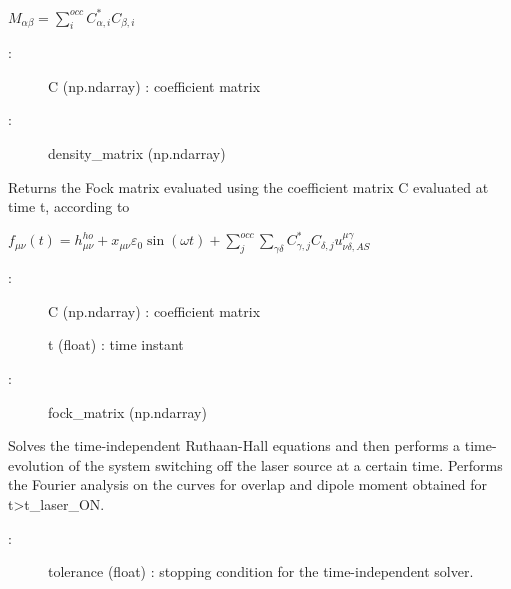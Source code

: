 \documentclass[letterpaper,10pt,english]{sphinxmanual}
\begin{document}
\begin{fulllineitems}
\begin{fulllineitems}
\(M_{\alpha\beta} = \sum_i^{occ} C_{\alpha,i}^* C_{\beta,i}\)
\begin{description}
\item[{:}] \leavevmode
C (np.ndarray) : coefficient matrix

\item[{:}] \leavevmode
density\_matrix (np.ndarray)

\end{description}

\end{fulllineitems}


\begin{fulllineitems}
\label{\detokenize{index:do.GHF.fill_fock_matrix}}
Returns the Fock matrix evaluated using the coefficient matrix C evaluated at time t, according to

\(f_{\mu\nu}(t) =  h_{\mu\nu}^{ho} + x_{\mu\nu} \varepsilon_0 \sin(\omega t) + \sum_{j}^{occ} \sum_{\gamma\delta} C_{\gamma,j}^* C_{\delta,j} u^{\mu\gamma}_{\nu\delta,AS}\)
\begin{description}
\item[{:}] \leavevmode
C (np.ndarray) : coefficient matrix

t (float) : time instant

\item[{:}] \leavevmode
fock\_matrix (np.ndarray)

\end{description}

\end{fulllineitems}


\begin{fulllineitems}
\label{\detokenize{index:do.GHF.fourier_analysis}}
Solves the time-independent Ruthaan-Hall equations and then performs a time-evolution of the system switching off the laser source at a certain time.
Performs the Fourier analysis on the curves for overlap and dipole moment obtained for t\textgreater{}t\_laser\_ON.
\begin{description}
\item[{:}] \leavevmode
tolerance (float) : stopping condition for the time-independent solver.


\end{description}
\end{fulllineitems}
\end{fulllineitems}
\end{document}
